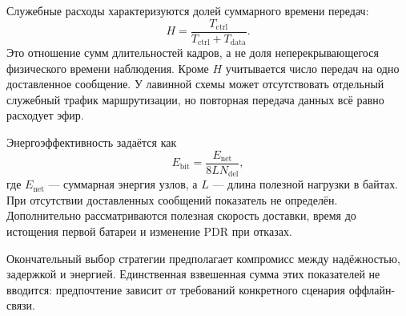 Служебные расходы характеризуются долей суммарного времени передач:
\begin{equation}
  H=\frac{T_{\mathrm{ctrl}}}{T_{\mathrm{ctrl}}+T_{\mathrm{data}}}.
\end{equation}
Это отношение сумм длительностей кадров, а не доля неперекрывающегося физического времени наблюдения. Кроме $H$ учитывается число передач на одно доставленное сообщение. У лавинной схемы может отсутствовать отдельный служебный трафик маршрутизации, но повторная передача данных всё равно расходует эфир.

Энергоэффективность задаётся как
\begin{equation}
  E_{\mathrm{bit}}=\frac{E_{\mathrm{net}}}{8L N_{\mathrm{del}}},
\end{equation}
где $E_{\mathrm{net}}$ --- суммарная энергия узлов, а $L$ --- длина полезной нагрузки в байтах. При отсутствии доставленных сообщений показатель не определён. Дополнительно рассматриваются полезная скорость доставки, время до истощения первой батареи и изменение PDR при отказах.

Окончательный выбор стратегии предполагает компромисс между надёжностью, задержкой и энергией. Единственная взвешенная сумма этих показателей не вводится: предпочтение зависит от требований конкретного сценария оффлайн-связи.
